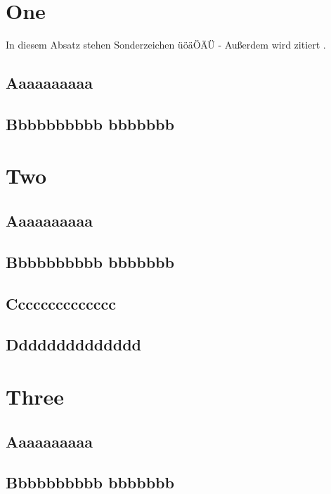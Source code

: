 \chapter{One}

\par In diesem Absatz stehen Sonderzeichen üöäÖÄÜ - Außerdem wird zitiert \cite{McAfee.2006}.

\section{Aaaaaaaaaa}
\lipsum
\section{Bbbbbbbbbb bbbbbbb}
\lipsum
\chapter{Two}
\section{Aaaaaaaaaa}
\lipsum
\section{Bbbbbbbbbb bbbbbbb}
\lipsum
\section{Cccccccccccccc}
\lipsum
\section{Dddddddddddddd}
\lipsum
\appendix
\chapter{Three}
\section{Aaaaaaaaaa}
\lipsum
\section{Bbbbbbbbbb bbbbbbb}
\lipsum